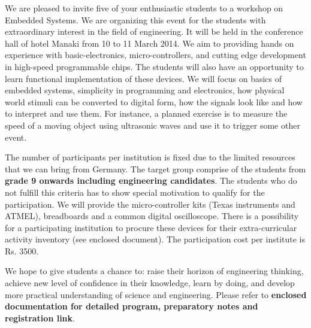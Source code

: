 \documentclass[10pt,stdletter,dateno,sigleft]{newlfm} %
\begin{document}
\begin{newlfm}

We are pleased to invite five of your enthusiastic students to a workshop on Embedded Systems. We are organizing this event for the students with extraordinary interest in the field of engineering. It will be held in the conference hall of hotel Manaki from 10 to 11 March 2014. We aim to providing hands on experience with basic-electronics, micro-controllers, and cutting edge development in high-speed programmable chips. The students will also have an opportunity to learn functional implementation of these devices. We will focus on basics of embedded systems, simplicity in programming and electronics, how physical world stimuli can be converted to digital form, how the signals look like and how to interpret and use them. For instance, a planned exercise is to measure the speed of a moving object using ultrasonic waves and use it to trigger some other event.
 
The number of participants per institution is fixed due to the limited resources that we can bring from Germany. The target group comprise of the students from \textbf{grade 9 onwards including engineering candidates}. The students who do not fulfill this criteria has to show special motivation to qualify for the participation. We will provide the micro-controller kits (Texas instruments and ATMEL), breadboards  and a common digital oscilloscope. There is a possibility for a participating institution to procure these devices for their extra-curricular activity inventory (see enclosed document). The participation cost per institute is Rs. 3500. 

We hope to give students a chance to: raise their horizon of engineering thinking, achieve new level of confidence in their knowledge, learn by doing, and develop more practical understanding of science and engineering. Please refer to \textbf{enclosed documentation for detailed program, preparatory notes and registration link}.\\[5pt]
\end{newlfm}
\end{document}
